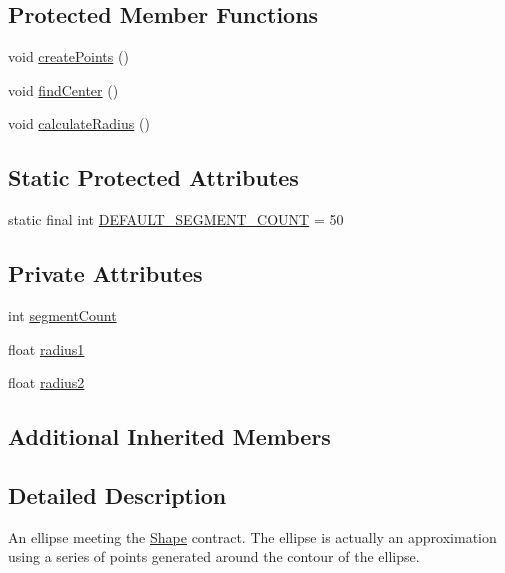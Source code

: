\subsection*{Protected Member Functions}
\begin{DoxyCompactItemize}
\item 
void \mbox{\hyperlink{classorg_1_1newdawn_1_1slick_1_1geom_1_1_ellipse_a0a824727a85257c3014c4f565b611fba}{create\+Points}} ()
\item 
void \mbox{\hyperlink{classorg_1_1newdawn_1_1slick_1_1geom_1_1_ellipse_a89903a1b75e22f6c308640cc2c05e252}{find\+Center}} ()
\item 
void \mbox{\hyperlink{classorg_1_1newdawn_1_1slick_1_1geom_1_1_ellipse_afef98fdf029020ec2289de898db6ec16}{calculate\+Radius}} ()
\end{DoxyCompactItemize}
\subsection*{Static Protected Attributes}
\begin{DoxyCompactItemize}
\item 
static final int \mbox{\hyperlink{classorg_1_1newdawn_1_1slick_1_1geom_1_1_ellipse_ab54d98cffdafc585874107a2d55c8fdb}{D\+E\+F\+A\+U\+L\+T\+\_\+\+S\+E\+G\+M\+E\+N\+T\+\_\+\+C\+O\+U\+NT}} = 50
\end{DoxyCompactItemize}
\subsection*{Private Attributes}
\begin{DoxyCompactItemize}
\item 
int \mbox{\hyperlink{classorg_1_1newdawn_1_1slick_1_1geom_1_1_ellipse_a08f529daee51987987eda5f422abdd31}{segment\+Count}}
\item 
float \mbox{\hyperlink{classorg_1_1newdawn_1_1slick_1_1geom_1_1_ellipse_a26f6d13c3b22a475bc1caf33f84a24b9}{radius1}}
\item 
float \mbox{\hyperlink{classorg_1_1newdawn_1_1slick_1_1geom_1_1_ellipse_ad3152cb17acd020ac3ae7bf70526ae9f}{radius2}}
\end{DoxyCompactItemize}
\subsection*{Additional Inherited Members}


\subsection{Detailed Description}
An ellipse meeting the {\ttfamily \mbox{\hyperlink{classorg_1_1newdawn_1_1slick_1_1geom_1_1_shape}{Shape}}} contract. The ellipse is actually an approximation using a series of points generated around the contour of the ellipse.

